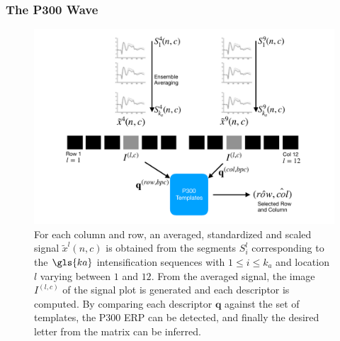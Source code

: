 \documentclass[aspectratio=169]{beamer}
\begin{document}
\begin{frame}
\frametitle{The P300 Wave}
\begin{center}
\begin{figure}[htb]
\centering
\includegraphics[width=15cm]{images/classificationgraph.pdf}
\caption[P300 Speller Matrix Letter Identification]{For each column and row, an averaged, standardized and scaled signal $\tilde{x}^l(n,c)$ is obtained from the segments $S_i^l$  corresponding to the $\gls{ka}$ intensification sequences with $ 1 \leq i \leq k_a $ and location $l$ varying between $1$ and $12$. From the averaged signal, the image $I^{(l,c)}$ of the signal plot is generated and each descriptor is computed.  By comparing each descriptor $\mathbf{q}$  against the set of templates, the P300 ERP can be detected, and finally the desired letter from the matrix can be inferred.}
\label{fig:classification}
\end{figure}
\end{center}
\end{frame}     
\end{document}
